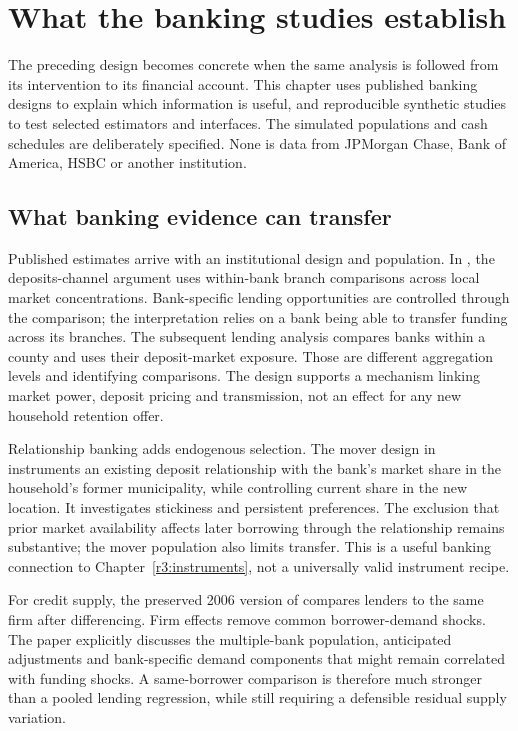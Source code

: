 \chapter{What the banking studies establish}
\label{r3:banking-studies}

The preceding design becomes concrete when the same analysis is followed
from its intervention to its financial account. This chapter uses published
banking designs to explain which information is useful, and reproducible
synthetic studies to test selected estimators and interfaces. The simulated
populations and cash schedules are deliberately specified. None is data
from JPMorgan Chase, Bank of America, HSBC or another institution.

\section{What banking evidence can transfer}
\label{r3:banking-evidence}

Published estimates arrive with an institutional design and population.
In \citet[printed pp.2--4]{drechsler2017}, the deposits-channel argument
uses within-bank branch comparisons across local market concentrations.
Bank-specific lending opportunities are controlled through the comparison;
the interpretation relies on a bank being able to transfer funding across
its branches. The subsequent lending analysis compares banks within a
county and uses their deposit-market exposure. Those are different
aggregation levels and identifying comparisons. The design supports a
mechanism linking market power, deposit pricing and transmission, not
an effect for any new household retention offer.

Relationship banking adds endogenous selection. The mover design in
\citet[Section 4.2.1, equations (6)--(8)]{basten2026} instruments an
existing deposit relationship with the bank's market share in the
household's former municipality, while controlling current share in
the new location. It investigates stickiness and persistent preferences.
The exclusion that prior market availability affects later borrowing
through the relationship remains substantive; the mover population
also limits transfer. This is a useful banking connection to
Chapter~\ref{r3:instruments}, not a universally valid instrument recipe.

For credit supply, the preserved 2006 version of
\citet[Section III.B, equation (5)]{mian2006} compares lenders to the same
firm after differencing. Firm effects remove common borrower-demand
shocks. The paper explicitly discusses the multiple-bank population,
anticipated adjustments and bank-specific demand components that might
remain correlated with funding shocks. A same-borrower comparison is
therefore much stronger than a pooled lending regression, while still
requiring a defensible residual supply variation.

